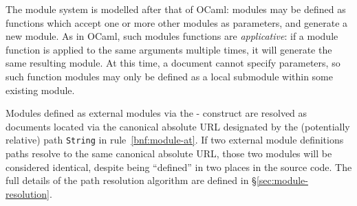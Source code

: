 The \Trilogy{} module system is modelled after that of OCaml: modules may
be defined as functions which accept one or more other modules as parameters,
and generate a new module. As in OCaml, such modules functions are \emph{applicative}:
if a module function is applied to the same arguments multiple times, it will
generate the same resulting module. At this time, a document cannot specify
parameters, so such function modules may only be defined as a local submodule
within some existing module.

Modules defined as external modules via the - construct
are resolved as documents located via the canonical absolute URL designated
by the (potentially relative) path \texttt{String} in rule~\ref{bnf:module-at}.
If two external module definitions paths resolve to the same canonical absolute
URL, those two modules will be considered identical, despite being ``defined''
in two places in the source code. The full details of the path resolution
algorithm are defined in \S\ref{sec:module-resolution}.

